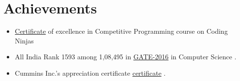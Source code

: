 \documentclass[a4paper,10pt]{article}
\begin{document}
	\section{Achievements}
	\begin{itemize}
	\item \href{http://files.codingninjas.in/certificate120385127582f078b1b89fee75fd48d65c87741.pdf}{Certificate} of excellence in Competitive Programming course on Coding Ninjas
		\item All India Rank 1593 among 1,08,495  in \href{https://drive.google.com/file/d/0B-2PYJZE99wQb1NCVHZFQjBsb0U/view}{GATE-2016} in Computer Science .
                \item Cummins Inc.’s appreciation certificate \href{https://drive.google.com/file/d/0B2kfGzkUmzWdbHJJZTRSLWJRVEE/view}{certificate} .
	\end{itemize}
\end{document}

